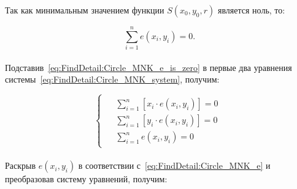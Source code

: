 Так как минимальным значением функции $S(x_0, y_0, r)$ является ноль, то:

\begin{equation}
    \label{eq:FindDetail:Circle_MNK_e_is_zero}
    \sum_{i=1}^{n} e(x_i, y_i) = 0.
\end{equation} \\

Подставив~\ref{eq:FindDetail:Circle_MNK_e_is_zero} в первые два уравнения системы~\ref{eq:FindDetail:Circle_MNK_system}, получим:

\begin{equation*}
    \begin{cases}
        \begin{aligned}
            &\sum_{i=1}^{n} \left[ x_i \cdot e(x_i, y_i) \right] = 0 \\
            &\sum_{i=1}^{n} \left[ y_i \cdot e(x_i, y_i) \right] = 0 \\
            &\sum_{i=1}^{n} e(x_i, y_i) = 0
        \end{aligned}
    \end{cases}
\end{equation*} \\

Раскрыв $e(x_i, y_i)$ в соответствии с~\ref{eq:FindDetail:Circle_MNK_e} и преобразовав систему уравнений, получим:

